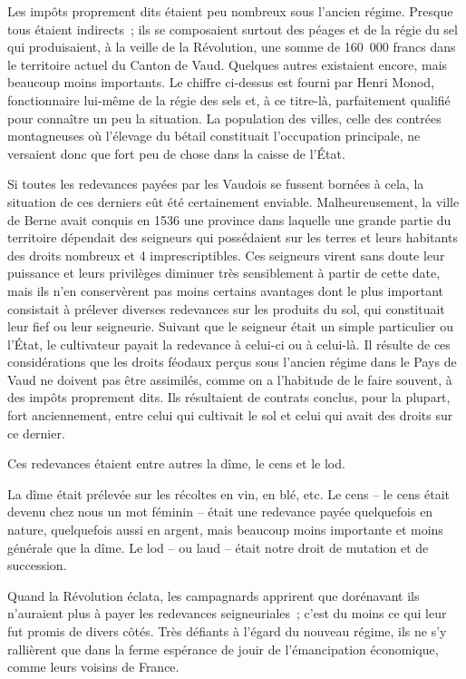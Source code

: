 \documentclass[french,twoside]{book} %
\newcommand\chaptercont{} %
\begin{document}
\chaptercont
\noindent Les impôts proprement dits étaient peu nombreux sous l’ancien régime. Presque tous étaient indirects ; ils se composaient surtout des péages et de la régie du sel qui produisaient, à la veille de la Révolution, une somme de 160 000 francs dans le territoire actuel du Canton de Vaud. Quelques autres existaient encore, mais beaucoup moins importants. Le chiffre ci-dessus est fourni par Henri Monod, fonctionnaire lui-même de la régie des sels et, à ce titre-là, parfaitement qualifié pour connaître un peu la situation. La population des villes, celle des contrées montagneuses où l’élevage du bétail constituait l’occupation principale, ne versaient donc que fort peu de chose dans la caisse de l’État.\par
Si toutes les redevances payées par les Vaudois se fussent bornées à cela, la situation de ces derniers eût été certainement enviable. Malheureusement, la ville de Berne avait conquis en 1536 une province dans laquelle une grande partie du territoire dépendait des seigneurs qui possédaient sur les terres et leurs habitants des droits nombreux et 4 imprescriptibles. Ces seigneurs virent sans doute leur puissance et leurs privilèges diminuer très sensiblement à partir de cette date, mais ils n’en conservèrent pas moins certains avantages dont le plus important consistait à prélever diverses redevances sur les produits du sol, qui constituait leur fief ou leur seigneurie. Suivant que le seigneur était un simple particulier ou l’État, le cultivateur payait la redevance à celui-ci ou à celui-là. Il résulte de ces considérations que les droits féodaux perçus sous l’ancien régime dans le Pays de Vaud ne doivent pas être assimilés, comme on a l’habitude de le faire souvent, à des impôts proprement dits. Ils résultaient de contrats conclus, pour la plupart, fort anciennement, entre celui qui cultivait le sol et celui qui avait des droits sur ce dernier.\par
Ces redevances étaient entre autres la dîme, le cens et le lod.\par
La dîme était prélevée sur les récoltes en vin, en blé, etc. Le cens – le cens était devenu chez nous un mot féminin – était une redevance payée quelquefois en nature, quelquefois aussi en argent, mais beaucoup moins importante et moins générale que la dîme. Le lod – ou laud – était notre droit de mutation et de succession.\par
Quand la Révolution éclata, les campagnards apprirent que dorénavant ils n’auraient plus à payer les redevances seigneuriales ; c’est du moins ce qui leur fut promis de divers côtés. Très défiants à l’égard du nouveau régime, ils ne s’y rallièrent que dans la ferme espérance de jouir de l’émancipation économique, comme leurs voisins de France.\par
\end{document}
